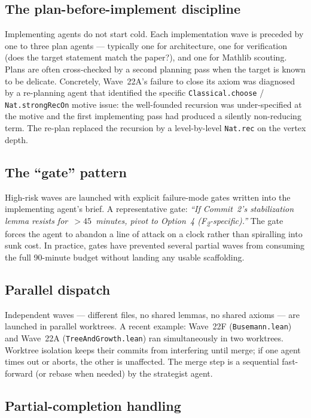 \documentclass[11pt,a4paper]{article}
\newcommand{\cmd}[1]{\texttt{\small #1}}
\theoremstyle{plain}
\theoremstyle{definition}
\begin{document}
\subsection{The plan-before-implement discipline}

Implementing agents do not start cold. Each implementation wave is
preceded by one to three plan agents --- typically one for architecture,
one for verification (does the target statement match the paper?), and
one for Mathlib scouting. Plans are often cross-checked by a second
planning pass when the target is known to be delicate. Concretely,
Wave~22A's failure to close its axiom was diagnosed by a re-planning
agent that identified the specific \cmd{Classical.choose} /
\cmd{Nat.strongRecOn} motive issue: the well-founded recursion was
under-specified at the motive and the first implementing pass had
produced a silently non-reducing term. The re-plan replaced the
recursion by a level-by-level \cmd{Nat.rec} on the vertex depth.

\subsection{The ``gate'' pattern}

High-risk waves are launched with explicit failure-mode gates written
into the implementing agent's brief. A representative gate:
\emph{``If Commit~2's stabilization lemma resists for~$>45$~minutes,
pivot to Option~4 (F\textsubscript{2}-specific).''} The gate forces
the agent to abandon a line of attack on a clock rather than
spiralling into sunk cost. In practice, gates have prevented several
partial waves from consuming the full 90-minute budget without
landing any usable scaffolding.

\subsection{Parallel dispatch}

Independent waves --- different files, no shared lemmas, no shared
axioms --- are launched in parallel worktrees. A recent example:
Wave~22F (\cmd{Busemann.lean}) and Wave~22A (\cmd{TreeAndGrowth.lean})
ran simultaneously in two worktrees. Worktree isolation keeps their
commits from interfering until merge; if one agent times out or
aborts, the other is unaffected. The merge step is a sequential
fast-forward (or rebase when needed) by the strategist agent.

\subsection{Partial-completion handling}
\end{document}
